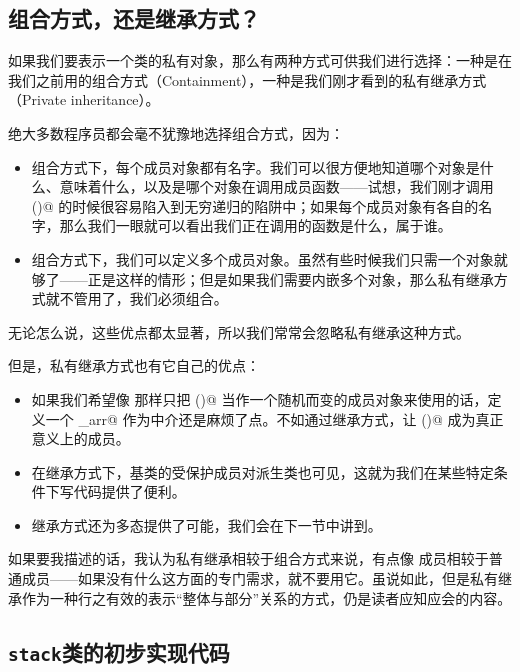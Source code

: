 \subsection*{组合方式，还是继承方式？}
如果我们要表示一个类的私有对象，那么有两种方式可供我们进行选择：一种是在我们之前用的组合方式（Containment），一种是我们刚才看到的私有继承方式（Private inheritance）。\par
绝大多数程序员都会毫不犹豫地选择组合方式，因为：
\begin{itemize}
    \item 组合方式下，每个成员对象都有名字。我们可以很方便地知道哪个对象是什么、意味着什么，以及是哪个对象在调用成员函数——试想，我们刚才调用 \lstinline@size()@ 的时候很容易陷入到无穷递归的陷阱中；如果每个成员对象有各自的名字，那么我们一眼就可以看出我们正在调用的函数是什么，属于谁。
    \item 组合方式下，我们可以定义多个成员对象。虽然有些时候我们只需一个对象就够了——\lstinline@stack@ 正是这样的情形；但是如果我们需要内嵌多个对象，那么私有继承方式就不管用了，我们必须组合。
\end{itemize}
无论怎么说，这些优点都太显著，所以我们常常会忽略私有继承这种方式。\par
但是，私有继承方式也有它自己的优点：
\begin{itemize}
    \item 如果我们希望像 \lstinline@Arr@ 那样只把 \lstinline@p()@ 当作一个随机而变的成员对象来使用的话，定义一个 \lstinline@_arr@ 作为中介还是麻烦了点。不如通过继承方式，让 \lstinline@p()@ 成为真正意义上的成员。
    \item 在继承方式下，基类的受保护成员对派生类也可见，这就为我们在某些特定条件下写代码提供了便利。
    \item 继承方式还为多态提供了可能，我们会在下一节中讲到。
\end{itemize}\par
如果要我描述的话，我认为私有继承相较于组合方式来说，有点像 \lstinline@mutable@ 成员相较于普通成员——如果没有什么这方面的专门需求，就不要用它。虽说如此，但是私有继承作为一种行之有效的表示``整体与部分''关系的方式，仍是读者应知应会的内容。\par
\subsection*{\texttt{stack}类的初步实现代码}


